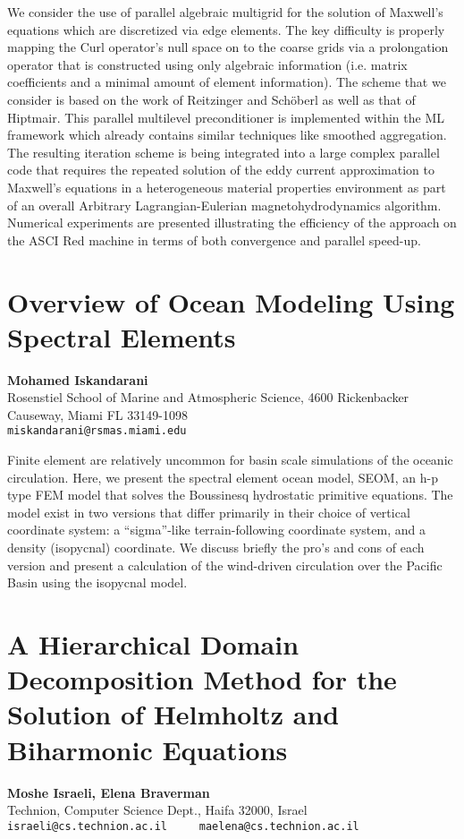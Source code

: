\documentclass[11pt]{article}
\newcommand{\nextab}[4]{
	\section{#2}
	{\bf #1} \\ \nopagebreak
	{#3} \\ \nopagebreak
	{\tt #4} \nopagebreak
	}
\begin{document}
We consider the use of parallel algebraic multigrid for the
solution of Maxwell's equations which are discretized via
edge elements.  The key difficulty is properly mapping the
Curl operator's null space on to the coarse grids via a
prolongation operator that is constructed using only
algebraic information (i.e. matrix coefficients and a
minimal amount of element information).  The scheme that we
consider is based on the work of Reitzinger and Sch\"oberl
as well as that of Hiptmair.  This parallel multilevel
preconditioner is implemented within the ML framework which
already contains similar techniques like smoothed
aggregation.  The resulting iteration scheme is being
integrated into a large complex parallel code that requires
the repeated solution of the eddy current approximation to
Maxwell's equations in a heterogeneous material properties
environment as part of an overall Arbitrary
Lagrangian-Eulerian magnetohydrodynamics algorithm.
Numerical experiments are presented illustrating the
efficiency of the approach on the ASCI Red machine in terms
of both convergence and parallel speed-up.



\nextab
{Mohamed Iskandarani}
{Overview of Ocean Modeling Using Spectral Elements}
{Rosenstiel School of Marine and Atmospheric Science,
4600 Rickenbacker Causeway, Miami FL 33149-1098}
{miskandarani@rsmas.miami.edu}

Finite element are relatively uncommon for basin scale simulations of
the oceanic circulation. Here, we present the spectral element ocean
model, SEOM, an h-p type FEM model that solves the Boussinesq
hydrostatic primitive equations. The model exist in two versions that
differ primarily in their choice of vertical coordinate system: a
``sigma''-like terrain-following coordinate system, and a density
(isopycnal) coordinate. We discuss briefly the pro's and cons of each
version and present a calculation of the wind-driven circulation over
the Pacific Basin using the isopycnal model.





\nextab
{Moshe Israeli, Elena Braverman}
{A Hierarchical Domain Decomposition Method for the Solution of Helmholtz and Biharmonic Equations}
{Technion, Computer Science Dept., Haifa 32000, Israel}
{israeli@cs.technion.ac.il ~ ~ maelena@cs.technion.ac.il}
\end{document}
